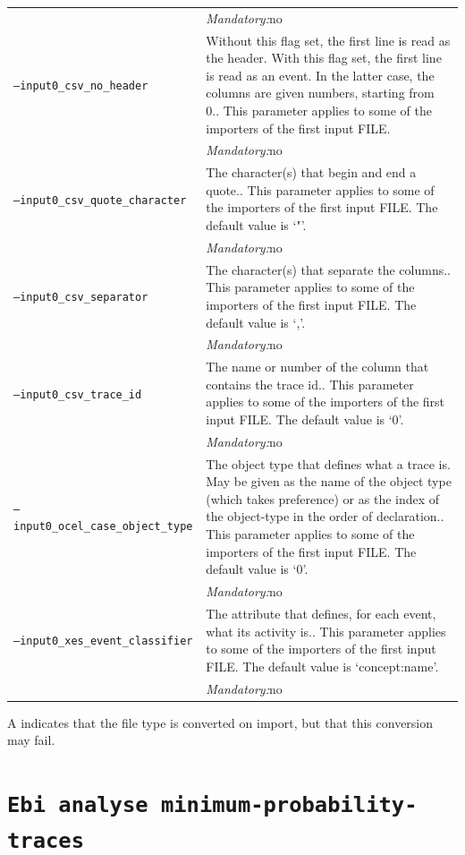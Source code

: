 {\begin{tabularx}{\linewidth}{lX}
&\textit{Mandatory:}\quad no\\
\texttt{--input0\_csv\_no\_header} & Without this flag set, the first line is read as the header. 
    With this flag set, the first line is read as an event. In the latter case, the columns are given numbers, starting from 0.. This parameter applies to some of the importers of the first input FILE. \\
&\textit{Mandatory:}\quad no\\
\texttt{--input0\_csv\_quote\_character} & The character(s) that begin and end a quote.. This parameter applies to some of the importers of the first input FILE. The default value is `"'.\\
&\textit{Mandatory:}\quad no\\
\texttt{--input0\_csv\_separator} & The character(s) that separate the columns.. This parameter applies to some of the importers of the first input FILE. The default value is `,'.\\
&\textit{Mandatory:}\quad no\\
\texttt{--input0\_csv\_trace\_id} & The name or number of the column that contains the trace id.. This parameter applies to some of the importers of the first input FILE. The default value is `0'.\\
&\textit{Mandatory:}\quad no\\
\texttt{--input0\_ocel\_case\_object\_type} & The object type that defines what a trace is. May be given as the name of the object type (which takes preference) or as the index of the object-type in the order of declaration.. This parameter applies to some of the importers of the first input FILE. The default value is `0'.\\
&\textit{Mandatory:}\quad no\\
\texttt{--input0\_xes\_event\_classifier} & The attribute that defines, for each event, what its activity is.. This parameter applies to some of the importers of the first input FILE. The default value is `concept:name'.\\
&\textit{Mandatory:}\quad no\\
\bottomrule
\end{tabularx}
A \textdagger{} indicates that the file type is converted on import, but that this conversion may fail.
\clearpage\section{\texttt{Ebi analyse minimum-probability-traces}}
\label{command:Ebi analyse minimum-probability-traces}
}
